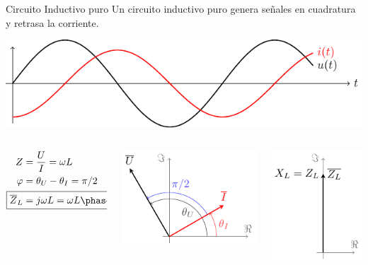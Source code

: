 \documentclass[aspectratio=169, usenames,svgnames,dvipsnames]{beamer}
\begin{document}
\begin{frame}[label={sec:orgae3e2aa}]{Circuito Inductivo puro}
Un circuito inductivo puro genera \alert{señales en cuadratura} y \alert{retrasa la corriente}.

\begin{center}
\includegraphics[height=0.3\textheight]{../figs/inductivoPuro.pdf}
\end{center}

\begin{columns}
\begin{column}{0.3\columnwidth}
\begin{align*}
  Z &= \frac{U}{I} = \omega L\\
  \varphi &= \theta_U - \theta_I = \pi/2\\
  \Aboxed{\overline{Z}_L &= j\omega L = \omega L \phase{\ang{90}}}
\end{align*}
\end{column}


\begin{column}{0.4\columnwidth}
\begin{center}
\includegraphics[height=0.4\textheight]{../figs/fasorInductancia_VI.pdf}
\end{center}
\end{column}


\begin{column}{0.3\columnwidth}
\begin{center}
\includegraphics[height=0.4\textheight]{../figs/fasorInductancia.pdf}
\end{center}
\end{column}
\end{columns}
\end{frame}
\end{document}
